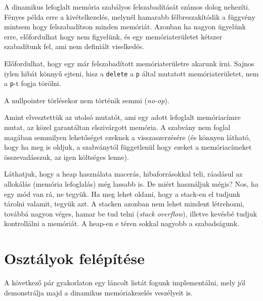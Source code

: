 \documentclass[a4paper,11.5pt]{article}
\begin{document}
	A dinamikus lefoglalt memória szabályos felszabadítását számos dolog nehezíti. Fényes példa erre a kivételkezelés, melynél hamarabb félbreszakítódik a függvény mintsem hogy felszabadítson minden memóriát. Azonban ha nagyon ügyelünk erre, előfordulhat hogy nem figyelünk, és egy memóriaterületet kétszer szabadítunk fel, ami nem definiált viselkedés.
	\medskip
	
	Előfordulhat, hogy egy már felszabadított memóriaterületre akarunk írni. Sajnos iylen hibát könnyű ejteni, hisz a \texttt{delete} a \texttt{p} által mutatott memóriaterületet, nem a \texttt{p}-t fogja törölni.
	\begin{note}
		A nullpointer törlésekor nem történik semmi (\textit{no-op}).
	\end{note}
	\begin{note}
		Amint elvesztettük az utolsó mutatót, ami egy adott lefoglalt memóriacímre mutat, az közel garantáltan elszivárgott memória. A szabvány nem foglal magában semmilyen lehetőséget ezeknek a visszaszerzésére (és könnyen látható, hogy ha meg is oldjuk, a szabványtól függetlenül hogy ezeket a memóriacímeket összevadásszuk, az igen költséges lenne).
	\end{note}
	Láthatjuk, hogy a heap használata macerás, hibaforrásokkal teli, ráadásul az allokálás (memória lefoglalás) még lassabb is. De miért használjuk mégis? Nos, ha egy mód van rá, ne tegyük. Ha meg lehet oldani, hogy a stack-en el tudjunk tárolni valamit, tegyük azt. A stacken azonban nem lehet mindent létrehozni, továbbá nagyon véges, hamar be tud telni (\textit{stack overflow}), illetve kevésbé tudjuk kontrollálni a memóriát. A heap-en e téren sokkal nagyobb a szabadságunk.
	\section{Osztályok felépítése}
	A következő pár gyakorlaton egy láncolt listát fogunk implementálni, mely jól demonstrálja majd a dinamikus memóriakezelés veszélyeit is.
	
\end{document}

